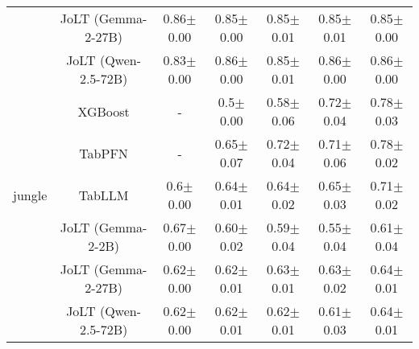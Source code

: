 \begin{table*}[htbp]
\begin{small}
\begin{sc}
\begin{adjustbox}{max width=\textwidth}
\begin{tabular}{rcccccc}
          & JoLT (Gemma-2-27B) & 0.86$\pm$0.00 & 0.85$\pm$0.00 & 0.85$\pm$0.01 & 0.85$\pm$0.01 & 0.85$\pm$0.00 \\
          & JoLT (Qwen-2.5-72B) & 0.83$\pm$0.00 & 0.86$\pm$0.00 & 0.85$\pm$0.01 & 0.86$\pm$0.00 & 0.86$\pm$0.00 \\
    \midrule
          & XGBoost & -     & 0.5$\pm$0.00 & 0.58$\pm$0.06 & 0.72$\pm$0.04 & 0.78$\pm$0.03 \\
          & TabPFN & -     & 0.65$\pm$0.07 & 0.72$\pm$0.04 & 0.71$\pm$0.06 & 0.78$\pm$0.02 \\
    \multicolumn{1}{l}{jungle} & TabLLM & 0.6$\pm$0.00 & 0.64$\pm$0.01 & 0.64$\pm$0.02 & 0.65$\pm$0.03 & 0.71$\pm$0.02 \\
          & JoLT (Gemma-2-2B) & 0.67$\pm$0.00 & 0.60$\pm$0.02 & 0.59$\pm$0.04 & 0.55$\pm$0.04 & 0.61$\pm$0.04 \\
          & JoLT (Gemma-2-27B) & 0.62$\pm$0.00 & 0.62$\pm$0.01 & 0.63$\pm$0.01 & 0.63$\pm$0.02 & 0.64$\pm$0.01 \\
          & JoLT (Qwen-2.5-72B) & 0.62$\pm$0.00 & 0.62$\pm$0.01 & 0.62$\pm$0.01 & 0.61$\pm$0.03 & 0.64$\pm$0.01 \\
    \bottomrule
    \end{tabular}%
    \end{adjustbox}
  \end{sc}
  \end{small}
  \vskip -0.1in
\end{table*}%



